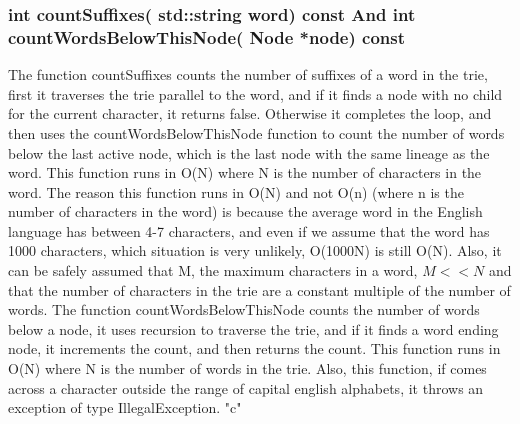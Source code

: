 \documentclass[a4paper]{article}
\begin{document}
\subsubsection{{\color{orange}int} {\color{draculapurple}countSuffixes}({\color{orange} std::string} word) {\color{GoldenYellow} const} And {\color{orange}int} {\color{draculapurple}countWordsBelowThisNode}({\color{orange} Node} *node) {\color{GoldenYellow} const}}
The function {\color{draculapurple}countSuffixes}  counts the number of suffixes of a word in the trie, first it traverses the trie parallel to the word, and if it 
finds a node with no child for the current character, it returns false. Otherwise it completes the loop, and then uses the 
{\color{draculapurple}countWordsBelowThisNode} function to count the number of words below the last active node, which is the 
last node with the same lineage as the word. This function runs in {\color{lightblue}O(N)} where {\color{lightblue}N} is the 
number of characters in the word. The reason this function runs in {\color{lightblue}O(N)} and not {\color{lightblue}O(n)} (where n is the number of characters in the word) is because the average word in the English language has between 4-7 characters, and even if we assume that the word has 1000 characters, which situation is very unlikely, {\color{lightblue}O(1000N)} is still {\color{lightblue}O(N)}. Also, it can be safely assumed that M, the maximum characters in a word, $M<<N$ and that the number of characters in the trie are a constant multiple of the number of words.
The function {\color{draculapurple}countWordsBelowThisNode} counts the number of words below a node, it uses recursion to traverse the trie, and if it finds a word ending node, it increments the count, and then returns the count. This function runs in {\color{lightblue}O(N)} where {\color{lightblue}N} is the number of words in the trie.
Also, this function, if comes across a character outside the range of capital english alphabets, it throws an exception of type {\color{orange}IllegalException}.
{\color{GoldenYellow} "c"}
\end{document}
